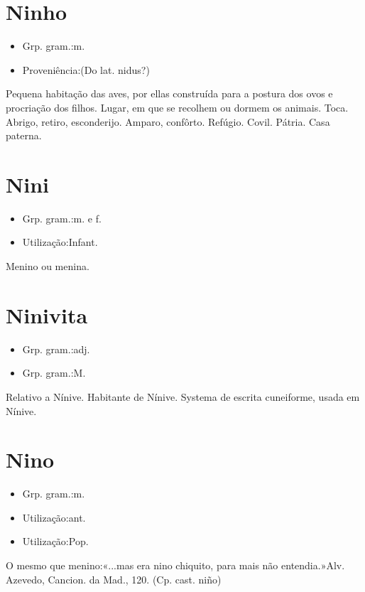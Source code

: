\section{Ninho}
\begin{itemize}
\item {Grp. gram.:m.}
\end{itemize}
\begin{itemize}
\item {Proveniência:(Do lat. \textunderscore nidus\textunderscore ?)}
\end{itemize}
Pequena habitação das aves, por ellas construída para a postura dos ovos e procriação dos filhos.
Lugar, em que se recolhem ou dormem os animais.
Toca.
Abrigo, retiro, esconderijo.
Amparo, confôrto.
Refúgio.
Covil.
Pátria.
Casa paterna.
\section{Nini}
\begin{itemize}
\item {Grp. gram.:m.  e  f.}
\end{itemize}
\begin{itemize}
\item {Utilização:Infant.}
\end{itemize}
Menino ou menina.
\section{Ninivita}
\begin{itemize}
\item {Grp. gram.:adj.}
\end{itemize}
\begin{itemize}
\item {Grp. gram.:M.}
\end{itemize}
Relativo a Nínive.
Habitante de Nínive.
Systema de escrita cuneiforme, usada em Nínive.
\section{Nino}
\begin{itemize}
\item {Grp. gram.:m.}
\end{itemize}
\begin{itemize}
\item {Utilização:ant.}
\end{itemize}
\begin{itemize}
\item {Utilização:Pop.}
\end{itemize}
O mesmo que \textunderscore menino\textunderscore :«\textunderscore ...mas era nino chiquito, para mais não entendia.\textunderscore »Alv. Azevedo, \textunderscore Cancion. da Mad.\textunderscore , 120.
(Cp. cast. \textunderscore niño\textunderscore )
